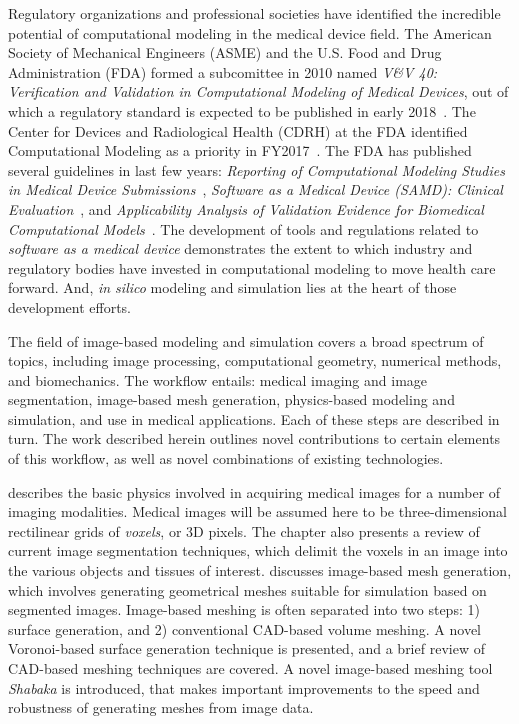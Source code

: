 Regulatory organizations and professional societies have identified the incredible potential of computational modeling in the medical device field. The American Society of Mechanical Engineers (ASME) and the U.S. Food and Drug Administration (FDA) formed a subcomittee in 2010 named \textit{V\&V 40: Verification and Validation in Computational Modeling of Medical Devices}, out of which a regulatory standard is expected to be published in early 2018~\cite{committee}. The Center for Devices and Radiological Health (CDRH) at the FDA identified Computational Modeling as a priority in FY2017~\cite{Morrison2017}. The FDA has published several guidelines in last few years: \textit{Reporting of Computational Modeling Studies in Medical Device Submissions}~\cite{fda1_2016}, \textit{Software as a Medical Device (SAMD): Clinical Evaluation}~\cite{fda1_2016}, and \textit{Applicability Analysis of Validation Evidence for Biomedical Computational Models}~\cite{pathmanathan_2017}. The development of tools and regulations related to \textit{software as a medical device} demonstrates the extent to which industry and regulatory bodies have invested in computational modeling to move health care forward. And, \textit{in silico} modeling and simulation lies at the heart of those development efforts.


The field of image-based modeling and simulation covers a broad spectrum of topics, including image processing, computational geometry, numerical methods, and biomechanics. The workflow entails: medical imaging and image segmentation, image-based mesh generation, physics-based modeling and simulation, and use in medical applications. Each of these steps are described in turn. The work described herein outlines novel contributions to certain elements of this workflow, as well as novel combinations of existing technologies.

 describes the basic physics involved in acquiring medical images for a number of imaging modalities. Medical images will be assumed here to be three-dimensional rectilinear grids of \textit{voxels}, or 3D pixels. The chapter also presents a review of current image segmentation techniques, which delimit the voxels in an image into the various objects and tissues of interest.  discusses image-based mesh generation, which involves generating geometrical meshes suitable for simulation based on segmented images. Image-based meshing is often separated into two steps: 1) surface generation,  and 2) conventional CAD-based volume meshing. A novel Voronoi-based surface generation technique is presented, and a brief review of CAD-based meshing techniques are covered. A novel image-based meshing tool \textit{Shabaka} is introduced, that makes important improvements to the speed and robustness of generating meshes from image data.

